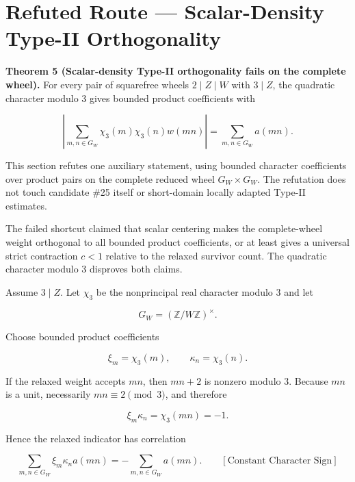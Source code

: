 \section{Refuted Route --- Scalar-Density Type-II Orthogonality}

\textbf{Theorem 5 (Scalar-density Type-II orthogonality fails on the complete
wheel).} For every pair of squarefree wheels $2\mid Z\mid W$ with $3\mid Z$,
the quadratic character modulo $3$ gives bounded product coefficients with

\begin{equation*}
\left|
\sum_{m,n\in G_W}\chi_3(m)\chi_3(n)w(mn)
\right|
=
\sum_{m,n\in G_W}a(mn).
\end{equation*}

This section refutes one auxiliary statement, using bounded character
coefficients over product pairs on the complete reduced wheel
$G_W\times G_W$. The refutation does not touch candidate \#25 itself or
short-domain locally adapted Type-II estimates.

The failed shortcut claimed that scalar centering makes the complete-wheel
weight orthogonal to all bounded product coefficients, or at least gives a
universal strict contraction $c\lt1$ relative to the relaxed survivor count.
The quadratic character modulo $3$ disproves both claims.

Assume $3\mid Z$. Let $\chi_3$ be the nonprincipal real character modulo $3$
and let

\begin{equation*}
G_W=(\mathbb Z/W\mathbb Z)^\times.
\end{equation*}

Choose bounded product coefficients

\begin{equation*}
\xi_m=\chi_3(m),
\qquad
\kappa_n=\chi_3(n).
\end{equation*}

If the relaxed weight accepts $mn$, then $mn+2$ is nonzero modulo $3$.
Because $mn$ is a unit, necessarily $mn\equiv2\pmod3$, and therefore

\begin{equation*}
\xi_m\kappa_n=\chi_3(mn)=-1.
\end{equation*}

Hence the relaxed indicator has correlation

\begin{equation*}
\sum_{m,n\in G_W}\xi_m\kappa_na(mn)
=
-\sum_{m,n\in G_W}a(mn).
\qquad[\text{Constant Character Sign}]
\end{equation*}

